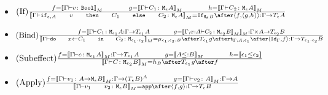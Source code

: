 {\begin{itemize}
 
    \item $\treerule{If}{f = \deno{\typerelation{\G}{v}{\B}}\s\s g = \deno{\typerelation{\G}{C_1}{\mea}}\s\s h = \deno{\typerelation{\G}{C_2}{\mea}}}{\deno{{\typerelation{\G}{\ifthenelse{\e}{A}{v}{C_1}{C_2}}{\mea}}} = \ifnt{\meb} \after \pr{f}{\pr{g}{h}} : \G \rightarrow \tea}$
        
    \item $\treerule{Bind}{f = \deno{\typerelation{\G}{C_1}{\M{\e_1}{A}} : \G \rightarrow \T{\e_1}{A}\s\s g = \deno{\typerelation{\gax}{C_2}{\M{\e_2}{B}}}}: \G \times A \rightarrow \T{\e_2}{B}}{\deno{\typerelation{\G}{\doin{x}{C_1}{C_2}}{\M{\e_1 \dot \e_2}}} = \bind{\e_1}{\e_2}{B} \after \T{\e_1}{g} \after \tstrength{\G}{A}{\e_1} \after \pr{\idg}{f}: \G \rightarrow \T{\e_1 \dot \e_2}{B}}$ 
    \item  $\treerule{Subeffect}{f = \deno{\typerelation{\G}{c}{\M{\e_1}{A}}}: \G \rightarrow \T{\e_1}{A} \s\s g = \deno{A \subtype B}\s\s h = \dse{\e_1}{\e_2}}{\deno{\typerelation{\G}{C}{\M{\e_2}{B}}} = h_B \after \T{\e_1}{g} \after f}$
    \item $\treerule{Apply}{f = \deno{\gtyperelation{v_1}{\lamtype{A}{\e}B}}: \G \rightarrow (\teb)^{A} \s\s g=\deno{\gtyperelation{v_2}{A}}: \G \rightarrow A}{\deno{\gtyperelation{\apply{v_1}{v_2}}{\meb}}= \app\after\pr{f}{g}: \G \rightarrow \teb }$
\end{itemize}
}
\ifdefined\NoDocument
\else
\documentclass{report}


    \Denotations

\fi